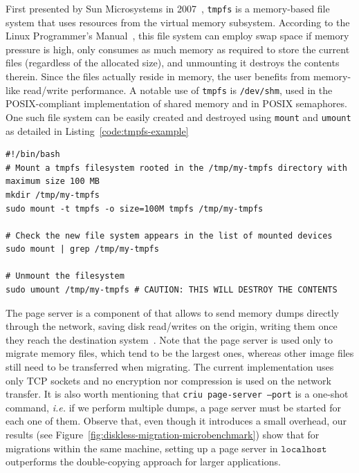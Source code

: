 First presented by Sun Microsystems in 2007~\cite{Snyder2007}, \texttt{tmpfs} is a memory-based file system that uses resources from the virtual memory subsystem.
According to the Linux Programmer's Manual~\cite{tmpfs-manpage}, this file system can employ swap space if memory pressure is high, only consumes as much memory as required to store the current files (regardless of the allocated size), and unmounting it destroys the contents therein.
Since the files actually reside in memory, the user benefits from memory-like read/write performance.
A notable use of \texttt{tmpfs} is \texttt{/dev/shm}, used in the POSIX-compliant implementation of shared memory and in POSIX semaphores.
One such file system can be easily created and destroyed using \texttt{mount} and \texttt{umount} as detailed in Listing~\ref{code:tmpfs-example}
\begin{lstlisting}[style=Bash,caption={Mounting and dismounting a \texttt{tmpfs} filesystem.\label{code:tmpfs-example}}]
#!/bin/bash
# Mount a tmpfs filesystem rooted in the /tmp/my-tmpfs directory with maximum size 100 MB
mkdir /tmp/my-tmpfs
sudo mount -t tmpfs -o size=100M tmpfs /tmp/my-tmpfs

# Check the new file system appears in the list of mounted devices
sudo mount | grep /tmp/my-tmpfs

# Unmount the filesystem 
sudo umount /tmp/my-tmpfs # CAUTION: THIS WILL DESTROY THE CONTENTS
\end{lstlisting}

The page server is a component of \criu that allows to send memory dumps directly through the network, saving disk read/writes on the origin, writing them once they reach the destination system~\cite{criu-page-server}.
Note that the page server is used only to migrate memory files, which tend to be the largest ones, whereas other image files still need to be transferred when migrating.
The current implementation uses only TCP sockets and no encryption nor compression is used on the network transfer.
It is also worth mentioning that \texttt{criu page-server --port} is a one-shot command, \textit{i.e.} if we perform multiple dumps, a page server must be started for each one of them.
Observe that, even though it introduces a small overhead, our results (see Figure~\ref{fig:diskless-migration-microbenchmark}) show that for migrations within the same machine, setting up a page server in $\texttt{localhost}$ outperforms the double-copying approach for larger applications.

